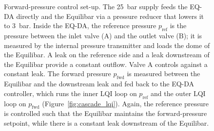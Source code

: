 \documentclass[12pt,a4paper]{article}
\begin{document}
\begin{figure}[ht]
    \caption{Forward-pressure control set-up. The 25~bar supply feeds the EQ-DA directly and
    the Equilibar via a pressure reducer that lowers it to 3~bar. Inside the EQ-DA, the reference pressure $p_{\mathrm{ref}}$ is
    the pressure between the inlet valve (A) and the outlet valve (B); it is
    measured by the internal pressure transmitter and loads the dome of the
    Equilibar. A leak on the reference side and a leak downstream of the
    Equilibar provide a constant outflow. Valve A controls against a constant leak. The forward pressure
    $p_{\mathrm{fwd}}$ is measured between the Equilibar and the downstream leak
    and fed back to the EQ-DA controller, which runs the inner LQI loop on
    $p_{\mathrm{ref}}$ and the outer LQI loop on $p_{\mathrm{fwd}}$
    (Figure~\ref{fig:cascade_lqi}). Again, the reference pressure is controlled such that the Equilibar maintains the forward-pressure setpoint, while there is a constant leak downstream of the Equilibar.}
    \label{fig:forward_pressure_setup}
\end{figure}

\newpage
\end{document}
